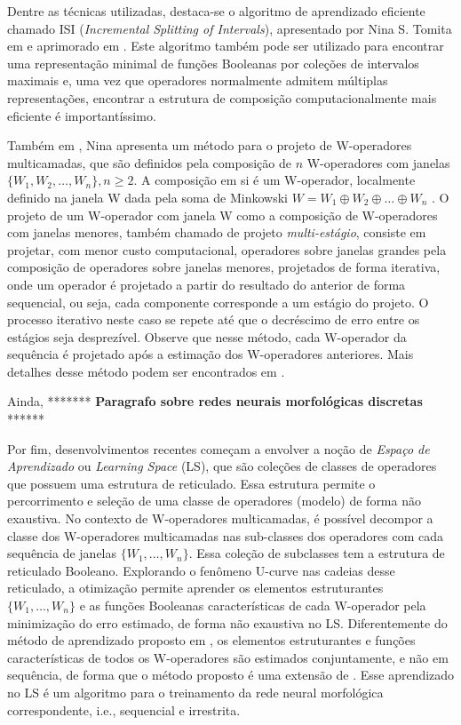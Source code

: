 Dentre as técnicas utilizadas, destaca-se o algoritmo de aprendizado eficiente chamado ISI (\textit{Incremental Splitting of Intervals}), apresentado por Nina S. Tomita em \cite{NINA:01} e aprimorado em  \cite{NINA:02}. Este algoritmo também pode ser utilizado para encontrar uma representação minimal de funções Booleanas por coleções de intervalos maximais e, uma vez que operadores normalmente admitem múltiplas representações, encontrar a estrutura de composição computacionalmente mais eficiente é importantíssimo.

Também em \cite{NINA:02}, Nina apresenta um método para o projeto de W-operadores multicamadas, que são definidos pela composição de $n$ W-operadores com janelas $\{W_{1},W_{2},\dots,W_{n}\}, n \geq 2$. A composição em si é um W-operador, localmente definido na janela W dada pela soma de Minkowski $W = W_{1} \oplus	W_{2} \oplus \dots \oplus W_{n}$ \cite{Barrera1996}. O projeto de um W-operador com janela W como a composição de W-operadores com janelas menores, também chamado de projeto \textit{multi-estágio}, consiste em projetar, com menor custo computacional, operadores sobre janelas grandes pela composição de operadores sobre janelas menores, projetados de forma iterativa, onde um operador é projetado a partir do resultado do anterior de forma sequencial, ou seja, cada componente corresponde a um estágio do projeto. O processo iterativo neste caso se repete até que o decréscimo de erro entre os estágios seja desprezível. Observe que nesse método, cada W-operador da sequência é projetado após a estimação dos W-operadores anteriores. Mais detalhes desse método podem ser encontrados em \cite{NINA:02}.

Ainda, ******* \textbf{Paragrafo sobre redes neurais morfológicas discretas} ******

Por fim, desenvolvimentos recentes começam a envolver a noção de \emph{Espaço de Aprendizado} ou \textit{Learning Space} (LS), que são coleções de classes de operadores que possuem uma estrutura de reticulado. Essa estrutura permite o percorrimento e seleção de uma classe de operadores (modelo) de forma não exaustiva. No contexto de W-operadores multicamadas, é possível decompor a classe dos W-operadores multicamadas nas sub-classes dos operadores com cada sequência de janelas $\{W_{1},\dots,W_{n}\}$. Essa coleção de subclasses tem a estrutura de reticulado Booleano. Explorando o fenômeno U-curve nas cadeias desse reticulado, a otimização permite aprender os elementos estruturantes $\{W_{1},\dots,W_{n}\}$ e as funções Booleanas características de cada W-operador pela minimização do erro estimado, de forma não exaustiva no LS. Diferentemente do método de aprendizado proposto em \cite{NINA:02}, os elementos estruturantes e funções características de todos os W-operadores são estimados conjuntamente, e não em sequência, de forma que o método proposto é uma extensão de \cite{NINA:02}. Esse aprendizado no LS é um algoritmo para o treinamento da rede neural morfológica correspondente, i.e., sequencial e irrestrita.

